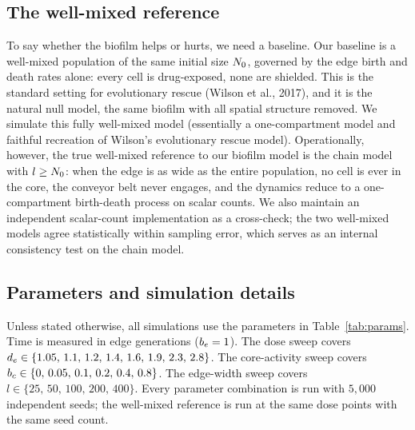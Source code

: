 \subsection{The well-mixed reference}
\label{ssec:wm}

To say whether the biofilm helps or hurts, we need a baseline. Our baseline is a well-mixed population of the same initial size $N_0$, governed by the edge birth and death rates alone: every cell is drug-exposed, none are shielded. This is the standard setting for evolutionary rescue (Wilson et al., 2017), and it is the natural null model, the same biofilm with all spatial structure removed. We simulate this fully well-mixed model (essentially a one-compartment model and faithful recreation of Wilson's evolutionary rescue model). Operationally, however, the true well-mixed reference to our biofilm model is the chain model with $l \ge N_0$: when the edge is as wide as the entire population, no cell is ever in the core, the conveyor belt never engages, and the dynamics reduce to a one-compartment birth-death process on scalar counts. We also maintain an independent scalar-count implementation as a cross-check; the two well-mixed models agree statistically within sampling error, which serves as an internal consistency test on the chain model.


\subsection{Parameters and simulation details}
\label{ssec:params}
Unless stated otherwise, all simulations use the parameters in Table~\ref{tab:params}. Time is measured in edge generations ($b_e = 1$). The dose sweep covers $d_e \in \{1.05,\,1.1,\,1.2,\,1.4,\,1.6,\,1.9,\,2.3,\,2.8\}$. The core-activity sweep covers $b_c \in \{0,\,0.05,\,0.1,\,0.2,\,0.4,\,0.8\}$. The edge-width sweep covers $l \in \{25,\,50,\,100,\,200,\,400\}$. Every parameter combination is run with $5{,}000$ independent seeds; the well-mixed reference is run at the same dose points with the same seed count.

